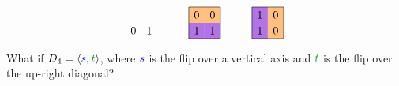 \documentclass[12pt]{article}
\theoremstyle{definition} %
\begin{document}
\[\begin{tikzpicture}[scale=1]
\begin{scope}[shift={(8,0)}]
        \draw (.25,.25) node{$0$}; \draw (.75,.25) node{$1$};
    \end{scope}
    \begin{scope}[shift={(10,0)}]
        \path[fill=actOrange] (0,.5) rectangle ++(.5,.5); 
        \path[fill=actOrange] (.5,.5) rectangle ++(.5,.5);
        \path[fill=actPurple] (0,0) rectangle ++(.5,.5);
        \path[fill=actPurple] (.5,0) rectangle ++(.5,.5);
        \draw (0,0) rectangle (1,1);
        \draw (.25,.75) node{$0$}; \draw (.75,.75) node{$0$};
        \draw (.25,.25) node{$1$}; \draw (.75,.25) node{$1$};
    \end{scope}
    \begin{scope}[shift={(12,0)}]
        \path[fill=actPurple] (0,.5) rectangle ++(.5,.5); 
        \path[fill=actOrange] (.5,.5) rectangle ++(.5,.5);
        \path[fill=actPurple] (0,0) rectangle ++(.5,.5);
        \path[fill=actOrange] (.5,0) rectangle ++(.5,.5);
        \draw (0,0) rectangle (1,1);
        \draw (.25,.75) node{$1$}; \draw (.75,.75) node{$0$};
        \draw (.25,.25) node{$1$}; \draw (.75,.25) node{$0$};
    \end{scope}
\end{tikzpicture}
\]

\newpage


What if $D_4 = \<\Balert{s}, \Galert{t}\>$, where $\Balert{s}$ is the flip over a vertical axis and $\Galert{t}$ is the flip over the up-right diagonal?
\end{document}
